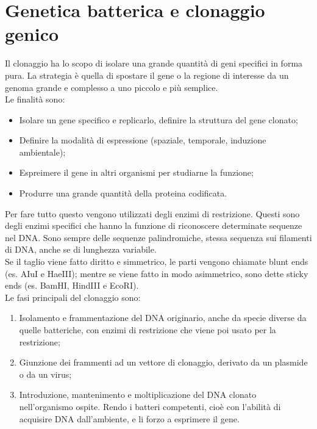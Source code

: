 \section{Genetica batterica e clonaggio genico}
Il clonaggio ha lo scopo di isolare una grande quantità di geni specifici in forma pura. La strategia è quella di spostare il gene o la regione di interesse da un genoma grande e complesso a uno piccolo e più semplice. 
\\Le finalità sono:
\begin{itemize}
    \item Isolare un gene specifico e replicarlo, definire la struttura del gene clonato;
    \item Definire la modalità di espressione (spaziale, temporale, induzione ambientale); 
    \item Espreimere il gene in altri organismi per studiarne la funzione;
    \item Produrre una grande quantità della proteina codificata.
\end{itemize}
Per fare tutto questo vengono utilizzati degli enzimi di restrizione. Questi sono degli enzimi specifici che hanno la funzione di riconoscere determinate sequenze nel DNA. Sono sempre delle sequenze palindromiche, stessa sequenza sui filamenti di DNA, anche se di lunghezza variabile. 
\\Se il taglio viene fatto diritto e simmetrico, le parti vengono chiamate blunt ends (es. AIuI e HaeIII); mentre se viene fatto in modo asimmetrico, sono dette sticky ends (es. BamHI, HindIII e EcoRI).
\\Le fasi principali del clonaggio sono:
\begin{enumerate}
    \item Isolamento e frammentazione del DNA originario, anche da specie diverse da quelle batteriche, con enzimi di restrizione che viene poi usato per la restrizione; 
    \item Giunzione dei frammenti ad un vettore di clonaggio, derivato da un plasmide o da un virus; 
    \item Introduzione, mantenimento e moltiplicazione del DNA clonato nell'organismo ospite. Rendo i batteri competenti, cioè con l'abilità di acquisire DNA dall'ambiente, e li forzo a esprimere il gene. 
\end{enumerate}
